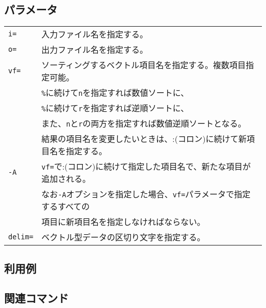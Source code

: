 \subsection*{パラメータ}
\begin{table}[htbp]
{\small
\begin{tabular}{ll}
\verb|i=|    & 入力ファイル名を指定する。\\
\verb|o=|    & 出力ファイル名を指定する。\\
\verb|vf=|   & ソーティングするベクトル項目名を指定する。複数項目指定可能。 \\
             & \verb|%|に続けて\verb|n|を指定すれば数値ソートに、 \\
             & \verb|%|に続けて\verb|r|を指定すれば逆順ソートに、 \\
             & また、\verb|n|と\verb|r|の両方を指定すれば数値逆順ソートとなる。\\
			 & 結果の項目名を変更したいときは、:(コロン)に続けて新項目名を指定する。\\
\verb|-A|    & \verb|vf=|で:(コロン)に続けて指定した項目名で、新たな項目が追加される。\\
             & なお\verb|-A|オプションを指定した場合、\verb|vf=|パラメータで指定するすべての\\
             & 項目に新項目名を指定しなければならない。\\
\verb|delim=| & ベクトル型データの区切り文字を指定する。\\
\end{tabular}
}
\end{table} 

\subsection*{利用例}


\subsection*{関連コマンド}

%

